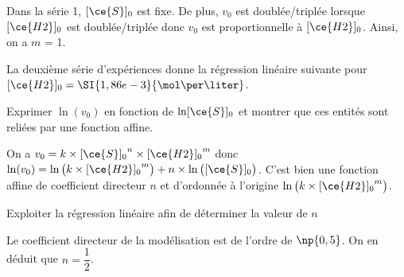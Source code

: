 \begin{corrige}
Dans la série 1, $[\ce{S}]_0$ est fixe. De plus, $v_0$ est doublée/triplée lorsque $[\ce{H2}]_0$ est doublée/triplée donc $v_0$ est proportionnelle à $[\ce{H2}]_0$. Ainsi, on a  $m$ = 1.
\end{corrige}

\bigskip

La deuxième série d'expériences donne la régression linéaire suivante pour $[\ce{H2}]_0=\SI{1,86e-3}{\mol\per\liter}$.

\begin{center}

\end{center}



\begin{enonce}
Exprimer $\ln (v_0)$ en fonction de $\ln [\ce{S}]_0$ et montrer que ces entités sont reliées par une fonction affine.

\end{enonce}


\begin{corrige}
On a $v_0 = k \times {[\ce{S}]_0}^n \times {[\ce{H2}]_0}^m$ donc $\ln(v_0) = \ln \big(k \times {[\ce{H2}]_0}^m\big) + n \times \ln \big([\ce{S}]_0\big)$. C'est bien une fonction affine de coefficient directeur $n$ et d'ordonnée à l'origine $\ln \big(k \times {[\ce{H2}]_0}^m\big)$.
\end{corrige}



\begin{enonce}
Exploiter la régression linéaire afin de déterminer la valeur de $n$
\end{enonce}


\begin{corrige}
Le coefficient directeur de la modélisation est de l'ordre de $\np{0,5}$. On en déduit que $n = \dfrac{1}{2}$.
\end{corrige}


